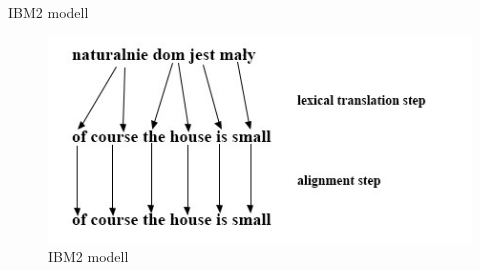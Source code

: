 \begin{frame}{IBM2 modell}
	\begin{figure}[t]
	  	\includegraphics[width=1\linewidth]{images/ibm2}
	  	\caption{IBM2 modell\footnotemark}
	  \end{figure}
\end{frame}
